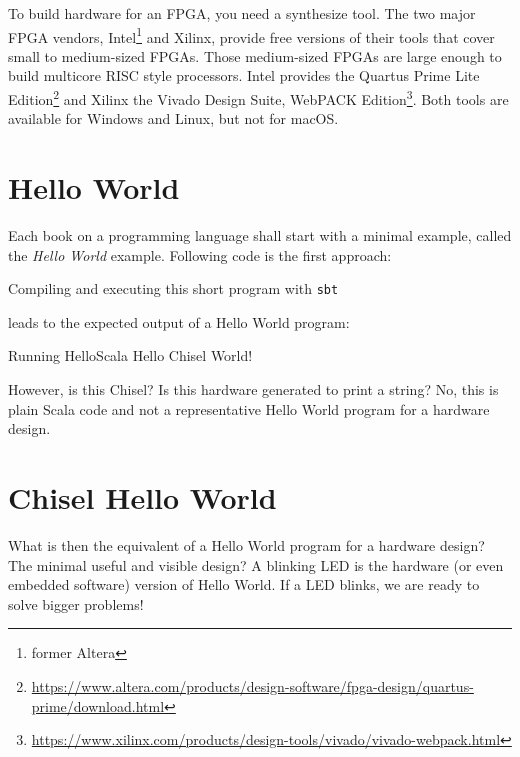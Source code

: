 \documentclass[%
    10pt,
    headinclude, footexclude,
    openright, %
    notitlepage,
    cleardoubleempty,
    headsepline,
    pointlessnumbers,
    bibtotoc, idxtotoc,
    ]{scrbook}
\newcommand{\code}[1]{{\small{\texttt{#1}}}}
\newcommand{\myref}[2]{\href{#1}{#2}}
\renewcommand{\myref}[2]{{#2}{\footnote{\url{#1}}}}
\begin{document}
To build hardware for an FPGA, you need a synthesize tool. The two major
FPGA vendors, Intel\footnote{former Altera} and Xilinx, provide free versions of
their tools that cover small to medium-sized FPGAs. Those medium-sized
FPGAs are large enough to build multicore RISC style processors.
Intel provides the \myref{https://www.altera.com/products/design-software/fpga-design/quartus-prime/download.html}{Quartus Prime Lite Edition} and Xilinx the
\myref{https://www.xilinx.com/products/design-tools/vivado/vivado-webpack.html}{Vivado Design Suite, WebPACK Edition}.
Both tools are available for Windows and Linux, but not for macOS.

\section{Hello World}

Each book on a programming language shall start with a minimal example,
called the \emph{Hello World} example. Following code is the first approach:




\noindent Compiling and executing this short program with \code{sbt}


\noindent leads to the expected output of a Hello World program:

\begin{chisel}
[info] Running HelloScala
Hello Chisel World!
\end{chisel}

\noindent However, is this Chisel? Is this hardware generated to print a string?
No, this is plain Scala code and not a representative Hello World
program for a hardware design.

\section{Chisel Hello World}

What is then the equivalent of a Hello World program for a hardware design?
The minimal useful and visible design? A blinking LED is the hardware (or even
embedded software) version of Hello World. If a LED blinks, we are ready to
solve bigger problems!

\end{document}
